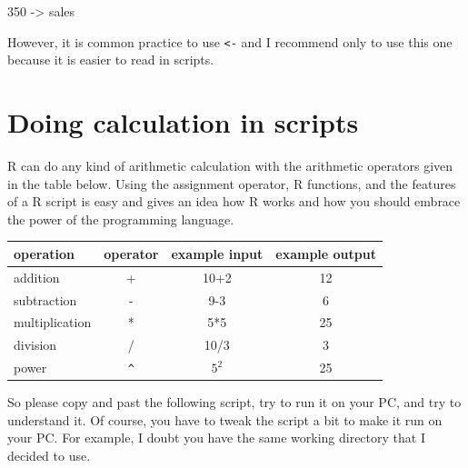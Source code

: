 \documentclass[
  12pt,
  oneside]{book}
\newenvironment{Shaded}{\begin{snugshade}}{\end{snugshade}}
\newcommand{\DecValTok}[1]{\textcolor[rgb]{0.00,0.00,0.81}{#1}}
\newcommand{\NormalTok}[1]{#1}
\newcommand{\OtherTok}[1]{\textcolor[rgb]{0.56,0.35,0.01}{#1}}
\begin{document}
\begin{Shaded}
\begin{Highlighting}[]
\DecValTok{350} \OtherTok{{-}\textgreater{}}\NormalTok{ sales}
\end{Highlighting}
\end{Shaded}

However, it is common practice to use \texttt{\textless{}-} and I recommend only to use this one because it is easier to read in scripts.

\hypertarget{doing-calculation-in-scripts}{%
\section{Doing calculation in scripts}\label{doing-calculation-in-scripts}}

R can do any kind of arithmetic calculation with the arithmetic operators given in the table below. Using the assignment operator, R functions, and the features of a R script is easy and gives an idea how R works and how you should embrace the power of the programming language.

\begin{longtable}[]{@{}lccc@{}}
\toprule()
operation & operator & example input & example output \\
\midrule()
\endhead
addition & + & 10+2 & 12 \\
subtraction & - & 9-3 & 6 \\
multiplication & * & 5*5 & 25 \\
division & / & 10/3 & 3 \\
power & \texttt{\^{}} & \(5^2\) & 25 \\
\bottomrule()
\end{longtable}

So please copy and past the following script, try to run it on your PC, and try to understand it. Of course, you have to tweak the script a bit to make it run on your PC. For example, I doubt you have the same working directory that I decided to use.
\end{document}
